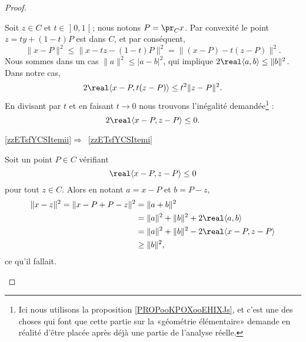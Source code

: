 \begin{proof}
\begin{subproof}
            Soit \( z\in C\) et \( t\in \mathopen] 0 , 1 \mathclose[\); nous notons \( P=\pr_Cx\). Par convexité le point \( z=ty+(1-t)P\) est dans \( C\), et par conséquent,
                \begin{equation}
                    \| x-P \|^2\leq\| x-tz-(1-t)P \|^2=\| (x-P)-t(z-P) \|^2.
                \end{equation}
                Nous sommes dans un cas \( \| a \|^2\leq | a-b |^2\), qui implique \( 2\real\langle a, b\rangle \leq \| b \|^2\). Dans notre cas,
                \begin{equation}
                    2\real\langle x-P , t(z-P)\rangle \leq t^2\| z-P \|^2.
                \end{equation}
                En divisant par \( t\) et en faisant \( t\to 0\) nous trouvons l'inégalité demandée\footnote{Ici nous utilisons la proposition \ref{PROPooKPOXooEHIXJs}, et c'est une des choses qui font que cette partie sur la «géométrie élémentaire» demande en réalité d'être placée après déjà une partie de l'analyse réelle.} :
                \begin{equation}
                    2\real\langle x-P, z-P\rangle \leq 0.
                \end{equation}

        \item[\ref{zzETsfYCSItemii}\( \Rightarrow\)~\ref{zzETsfYCSItemi}]

            Soit un point \( P\in C\) vérifiant
            \begin{equation}
                \real\langle x-P, z-P\rangle \leq 0
            \end{equation}
            pour tout \( z\in C\). Alors en notant \( a=x-P\) et \( b=P-z\),
            \begin{equation}
                \begin{aligned}[]
                \| x-z \|^2=\| x-P+P-z \|^2&=\| a+b \|^2\\
                &=\| a \|^2+\| b \|^2+2\real\langle a, b\rangle \\
                &=\| a \|^2+\| b \|^2-2\real\langle x-P, z-P\rangle \\
                &\geq \| b \|^2,
                \end{aligned}
            \end{equation}
            ce qu'il fallait.
    \end{subproof}
\end{proof}

